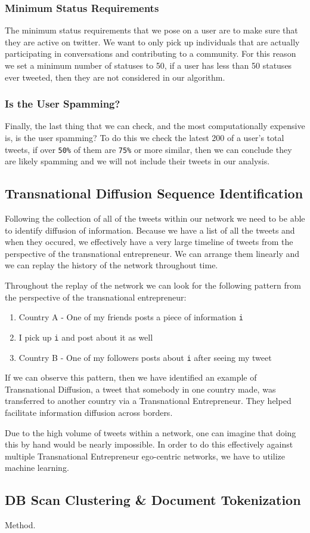 \subsubsection{Minimum Status Requirements}
The minimum status requirements that we pose on a user are to make sure that they are active on twitter. We want to only pick up individuals that are actually participating in conversations and contributing to a community. For this reason we set a minimum number of statuses to 50, if a user has less than 50 statuses ever tweeted, then they are not considered in our algorithm.

\subsubsection{Is the User Spamming?}
Finally, the last thing that we can check, and the most computationally expensive is, is the user spamming? To do this we check the latest 200 of a user's total tweets, if over \verb|50%| of them are \verb|75%| or more similar, then we can conclude they are likely spamming and we will not include their tweets in our analysis.

\subsection{Transnational Diffusion Sequence Identification}
Following the collection of all of the tweets within our network we need to be able to identify diffusion of information. Because we have a list of all the tweets and when they occured, we effectively have a very large timeline of tweets from the perspective of the transnational entrepreneur. We can arrange them linearly and we can replay the history of the network throughout time. 

\par

Throughout the replay of the network we can look for the following pattern from the perspective of the transnational entrepreneur:

\begin{enumerate}
\item Country A - One of my friends posts a piece of information \verb|i| 
\item I pick up \verb|i| and post about it as well
\item Country B - One of my followers posts about \verb|i| after seeing my tweet
\end{enumerate}

If we can observe this pattern, then we have identified an example of Transnational Diffusion, a tweet that somebody in one country made, was transferred to another country via a Transnational Entrepreneur. They helped facilitate information diffusion across borders.
\par
Due to the high volume of tweets within a network, one can imagine that doing this by hand would be nearly impossible. In order to do this effectively against multiple Transnational Entrepreneur ego-centric networks, we have to utilize machine learning.

\subsection{DB Scan Clustering \& Document Tokenization}
Method.
